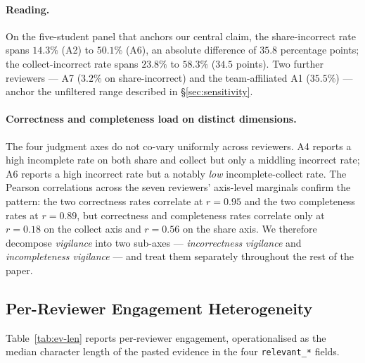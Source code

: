 \documentclass[11pt,a4paper]{article}
\newcommand{\Acc}[1]{\textsf{A#1}}
\begin{document}
\paragraph{Reading.}
On the five-student panel that anchors our central claim, the
share-incorrect rate spans $14.3\%$ (\Acc{2}) to $50.1\%$ (\Acc{6}),
an absolute difference of $35.8$ percentage points; the
collect-incorrect rate spans $23.8\%$ to $58.3\%$ ($34.5$ points).
Two further reviewers --- \Acc{7} ($3.2\%$ on share-incorrect) and
the team-affiliated \Acc{1} ($35.5\%$) --- anchor the unfiltered
range described in \S\ref{sec:sensitivity}.

\paragraph{Correctness and completeness load on distinct dimensions.}
The four judgment axes do not co-vary uniformly across reviewers.
\Acc{4} reports a high incomplete rate on both share and collect
but only a middling incorrect rate; \Acc{6} reports a high incorrect
rate but a notably \emph{low} incomplete-collect rate. The Pearson
correlations across the seven reviewers' axis-level marginals
confirm the pattern: the two correctness rates correlate at
$r=0.95$ and the two completeness rates at $r=0.89$, but
correctness and completeness rates correlate only at
$r=0.18$ on the collect axis and $r=0.56$ on the share axis. We
therefore decompose \emph{vigilance} into two sub-axes ---
\emph{incorrectness vigilance} and \emph{incompleteness vigilance}
--- and treat them separately throughout the rest of the paper.

\subsection{Per-Reviewer Engagement Heterogeneity}
\label{sec:engagement}

Table~\ref{tab:ev-len} reports per-reviewer engagement, operationalised
as the median character length of the pasted evidence in the four
\texttt{relevant\_*} fields.
\end{document}
